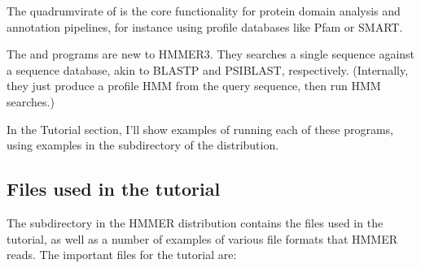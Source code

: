 The quadrumvirate of  is the
core functionality for protein domain analysis and annotation
pipelines, for instance using profile databases like Pfam or
SMART. 

The  and  programs are new to
HMMER3. They searches a single sequence against a sequence database,
akin to BLASTP and PSIBLAST, respectively. (Internally, they just
produce a profile HMM from the query sequence, then run HMM searches.)

In the Tutorial section, I'll show examples of running each of these
programs, using examples in the  subdirectory of the
distribution.


\subsection{Files used in the tutorial}

The subdirectory  in the HMMER distribution contains the
files used in the tutorial, as well as a number of examples of various
file formats that HMMER reads. The important files for the tutorial
are:

